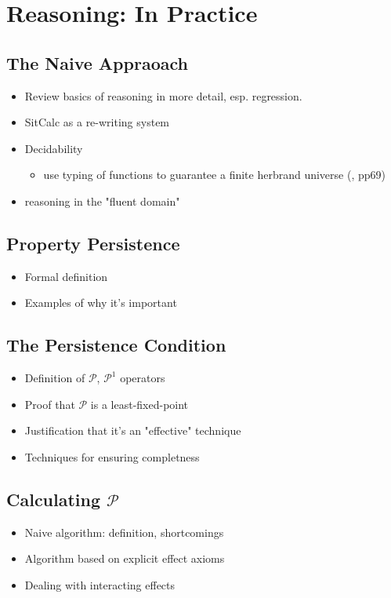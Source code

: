 \chapter{Reasoning: In Practice}\label{ch:reasoning-practice}

\section{The Naive Appraoach}

\begin{itemize}
\item Review basics of reasoning in more detail, esp. regression.
\item SitCalc as a re-writing system
\item Decidability
  \begin{itemize}
  \item use typing of functions to guarantee a finite herbrand universe (\cite{levesque04krr_book}, pp69)
  \end{itemize}
\item reasoning in the "fluent domain"
\end{itemize}

\section{Property Persistence}

\begin{itemize}
\item Formal definition
\item Examples of why it's important
\end{itemize}

\section{The Persistence Condition}

\begin{itemize}
\item Definition of $\mathcal{P}$, $\mathcal{P}^{1}$ operators
\item Proof that $\mathcal{P}$ is a least-fixed-point
\item Justification that it's an "effective" technique
\item Techniques for ensuring completness
\end{itemize}

\section{Calculating $\mathcal{P}$}

\begin{itemize}
\item Naive algorithm: definition, shortcomings
\item Algorithm based on explicit effect axioms
\item Dealing with interacting effects
\end{itemize}


